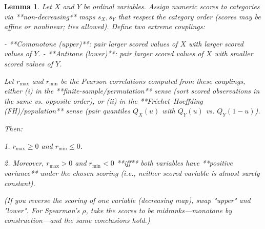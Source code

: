 \documentclass[
  12pt,
]{article}
\theoremstyle{plain}
\newtheorem{lemma}[theorem]{Lemma}
\theoremstyle{definition}
\theoremstyle{remark}
\begin{document}
\label{prop-max-product}
\begin{lemma}

Let $X$ and $Y$ be ordinal variables. Assign numeric scores to categories via **non-decreasing** maps $s_X, s_Y$ that respect the category order (scores may be affine or nonlinear; ties allowed). Define two extreme couplings:

- **Comonotone (upper)**: pair larger scored values of $X$ with larger scored values of $Y$.
- **Antitone (lower)**: pair larger scored values of $X$ with smaller scored values of $Y$.
    

Let $r_{\max}$ and $r_{\min}$ be the Pearson correlations computed from these couplings, either (i) in the **finite-sample/permutation** sense (sort scored observations in the same vs. opposite order), or (ii) in the **Fréchet–Hoeffding (FH)/population** sense (pair quantiles $Q_X(u)$ with $Q_Y(u)$ vs. $Q_Y(1-u)$).

Then:

1. $r_{\max}\ge 0$ and $r_{\min}\le 0$.
    
2. Moreover, $r_{\max}>0$ and $r_{\min}<0$ **iff** both variables have **positive variance** under the chosen scoring (i.e., neither scored variable is almost surely constant).
    

\textit{(If you reverse the scoring of one variable (decreasing map), swap "upper" and "lower". For Spearman's $\rho$, take the scores to be midranks---monotone by construction---and the same conclusions hold.)}
\end{lemma}
\end{document}
